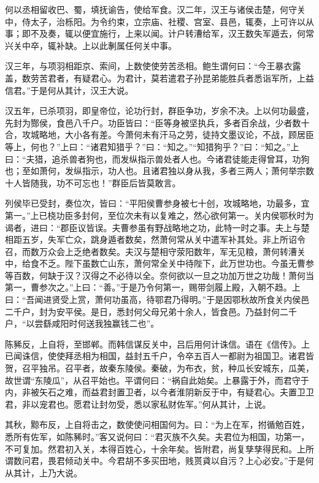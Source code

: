 \documentclass[]{article}
\begin{document}
何以丞相留收巴、蜀，填抚谕告，使给军食。汉二年，汉王与诸侯击楚，何守关中，侍太子，治栎阳。为令约束，立宗庙、社稷、宫室、县邑，辄奏，上可许以从事；即不及奏，辄以便宜施行，上来以闻。计户转漕给军，汉王数失军遁去，何常兴关中卒，辄补缺。上以此剸属任何关中事。

汉三年，与项羽相距京、索间，上数使使劳苦丞相。鲍生谓何曰：``今王暴衣露盖，数劳苦君者，有疑君心。为君计，莫若遣君子孙昆弟能胜兵者悉诣军所，上益信君。''于是何从其计，汉王大说。

汉五年，已杀项羽，即皇帝位，论功行封，群臣争功，岁余不决。上以何功最盛，先封为酂侯，食邑八千户。功臣皆曰：``臣等身被坚执兵，多者百余战，少者数十合，攻城略地，大小各有差。今萧何未有汗马之劳，徒持文墨议论，不战，顾居臣等上，何也？''上曰：``诸君知猎乎？''曰：``知之。''``知猎狗乎？''曰：``知之。''上曰：``夫猎，追杀兽者狗也，而发纵指示兽处者人也。今诸君徒能走得曾耳，功狗也；至如萧何，发纵指示，功人也。且诸君独以身从我，多者三两人；萧何举宗数十人皆随我，功不可忘也！''群臣后皆莫敢言。

列侯毕已受封，奏位次，皆曰：``平阳侯曹参身被七十创，攻城略地，功最多，宜第一。''上已桡功臣多封何，至位次未有以复难之，然心欲何第一。关内侯鄂秋时为谒者，进曰：``郡臣议皆误。夫曹参虽有野战略地之功，此特一时之事。夫上与楚相距五岁，失军亡众，跳身遁者数矣，然萧何常从关中遣军补其处。非上所诏令召，而数万众会上乏绝者数矣。夫汉与楚相守荥阳数年，军无见粮，萧何转漕关中，给食不乏。陛下虽数亡山东，萧何常全关中待陛下，此万世功也。今虽无曹参等百数，何缺于汉？汉得之不必待以全。奈何欲以一旦之功加万世之功哉！萧何当第一，曹参次之。''上曰：``善。''于是乃令何第一，赐带剑履上殿，入朝不趋。上曰：``吾闻进贤受上赏，萧何功虽高，待鄂君乃得明。''于是因鄂秋故所食关内侯邑二千户，封为安平侯。是日，悉封何父母兄弟十余人，皆食邑。乃益封何二千户，``以尝繇咸阳时何送我独赢钱二也''。

陈豨反，上自将，至邯郸。而韩信谋反关中，吕后用何计诛信。语在《信传》。上已闻诛信，使使拜丞相为相国，益封五千户，令卒五百人一都尉为祖国卫。诸君皆贺，召平独吊。召平者，故秦东陵侯。秦破，为布衣，贫，种瓜长安城东，瓜美，故世谓``东陵瓜''，从召平始也。平谓何曰：``祸自此始矣。上暴露于外，而君守于内，非被矢石之难，而益君封置卫者，以今者淮阴新反于中，有疑君心。夫置卫卫君，非以宠君也。愿君让封勿受，悉以家私财佐军。''何从其计，上说。

其秋，黥布反，上自将击之，数使使问相国何为。曰：``为上在军，拊循勉百姓，悉所有佐军，如陈豨时。''客又说何曰：``君灭族不久矣。夫君位为相国，功第一，不可复加。然君初入关，本得百姓心，十余年矣。皆附君，尚复孳孳得民和。上所谓数问君，畏君倾动关中。今君胡不多买田地，贱贳貣以自污？上心必安。''于是何从其计，上乃大说。
\end{document}
